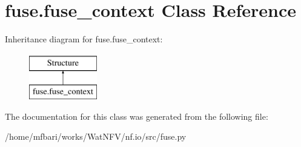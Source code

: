 \hypertarget{classfuse_1_1fuse__context}{\section{fuse.\-fuse\-\_\-context Class Reference}
\label{classfuse_1_1fuse__context}
}
Inheritance diagram for fuse.\-fuse\-\_\-context\-:\begin{figure}[H]
\begin{center}
\leavevmode
\includegraphics[height=2.000000cm]{classfuse_1_1fuse__context}
\end{center}
\end{figure}


The documentation for this class was generated from the following file\-:\begin{DoxyCompactItemize}
\item 
/home/mfbari/works/\-Wat\-N\-F\-V/nf.\-io/src/fuse.\-py\end{DoxyCompactItemize}
